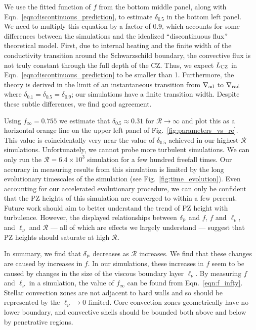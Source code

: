 \documentclass[twocolumn]{aastex631}
\newcommand{\gradrad}{\ensuremath{\nabla_{\rm{rad}}}}
\newcommand{\gradad}{\ensuremath{\nabla_{\rm{ad}}}}
\newcommand{\delp}{\ensuremath{\delta_{\rm{p}}}}
\newcommand{\mR}{\ensuremath{\mathcal{R}}}
\begin{document}
We use the fitted function of $f$ from the bottom middle panel, along with Eqn.~\ref{eqn:discontinuous_prediction}, to estimate $\delta_{0.5}$ in the bottom left panel.
We need to multiply this equation by a factor of 0.9, which accounts for some differences between the simulations and the idealized ``discontinuous flux'' theoretical model.
First, due to internal heating and the finite width of the conductivity transition around the Schwarzschild boundary, the convective flux is not truly constant through the full depth of the CZ.
Thus, we expect $L_{\rm{CZ}}$  in Eqn.~\ref{eqn:discontinuous_prediction} to be smaller than 1.
Furthermore, the theory is derived in the limit of an instantaneous transition from $\gradad$ to $\gradrad$ where $\delta_{0.1} = \delta_{0.5} = \delta_{0.9}$; our simulations have a finite transition width.
Despite these subtle differences, we find good agreement.

Using $f_\infty = 0.755$ we estimate that $\delta_{0.5} \approx 0.31$ for $\mR \rightarrow \infty$ and plot this as a horizontal orange line on the upper left panel of Fig.~\ref{fig:parameters_vs_re}.
This value is coincidentally very near the value of $\delta_{0.5}$ achieved in our highest-$\mR$ simulations.
Unfortunately, we cannot probe more turbulent simulations.
We can only run the $\mR = 6.4 \times 10^{3}$ simulation for a few hundred freefall times.
Our accuracy in measuring results from this simulation is limited by the long evolutionary timescales of the simulation (see Fig.~\ref{fig:time_evolution}).
Even accounting for our accelerated evolutionary procedure, we can only be confident that the PZ heights of this simulation are converged to within a few percent.
Future work should aim to better understand the trend of PZ height with turbulence.
However, the displayed relationships between $\delp$ and $f$, $f$ and $\ell_\nu$, and $\ell_\nu$ and $\mR$ --- all of which are effects we largely understand --- suggest that PZ heights should saturate at high $\mR$.

In summary, we find that $\delp$ decreases as $\mR$ increases.
We find that these changes are caused by increases in $f$.
In our simulations, these increases in $f$ seem to be caused by changes in the size of the viscous boundary layer $\ell_\nu$.
By measuring $f$ and $\ell_\nu$ in a simulation, the value of $f_\infty$ can be found from Eqn.~\ref{eqn:f_infty}.
Stellar convection zones are not adjacent to hard walls and so should be represented by the $\ell_\nu \rightarrow 0$ limited.
Core convection zones geometrically have no lower boundary, and convective shells should be bounded both above and below by penetrative regions.
\end{document}
